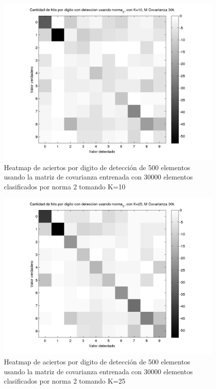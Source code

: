 \begin{figure}[H]
\includegraphics[width=\hmwidth]{plots/heatmap-30kcv-k10-norma_2.png}
\caption{Heatmap de aciertos por digito de detecci\'on de 500 elementos usando la matriz de covarianza entrenada con 30000 elementos
clasificados por norma 2 tomando K=10 }
\label{fig:HM30kcv-k10}
\end{figure}

\begin{figure}[H]
\includegraphics[width=\hmwidth]{plots/heatmap-30kcv-k25-norma_2.png}
\caption{Heatmap de aciertos por digito de detecci\'on de 500 elementos usando la matriz de covarianza entrenada con 30000 elementos
clasificados por norma 2 tomando K=25 }
\label{fig:HM30kcv-k25}
\end{figure}

